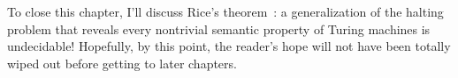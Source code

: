 \label{sec:ricestheorem}

\begin{construction}
To close this chapter, I'll discuss Rice's theorem~\citeyearpar{Rice1953ClassesRecursivelyEnumerable}: a generalization of the halting problem that reveals every nontrivial semantic property of Turing machines is undecidable! Hopefully, by this point, the reader's hope will not have been totally wiped out before getting to later chapters.
\end{construction}